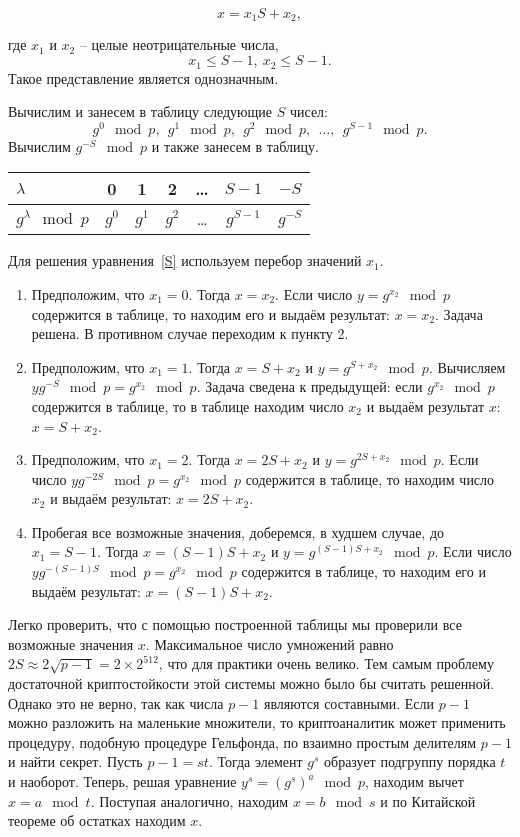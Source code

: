 \begin{equation}
    x=x_{1} S+x_{2},
    \label{S}
\end{equation}

где $x_{1}$ и $x_{2}$ -- целые неотрицательные числа,
    \[ x_{1} \le S-1, ~ x_{2} \le S-1. \]
Такое представление является однозначным.

Вычислим и занесем в таблицу следующие $S$  чисел:
    \[ g^{0} \mod p, ~~ g^{1} \mod p, ~~ g^{2} \mod p, ~~ \dots, ~~ g^{S-1} \mod p. \]
Вычислим $g^{-S} \mod p$ и также занесем в таблицу.

\begin{center} \begin{tabular}{|l|c|c|c|c|c|c|}
    \hline
    $\lambda $ & 0 & 1 & 2 & \dots & $S-1$ & $-S$ \\
    \hline
    $g^{\lambda} \mod p$ & $g^{0}$ & $g^{1}$ & $g^{2}$ & \dots & $g^{S-1}$ & $g^{-S}$ \\
    \hline
\end{tabular} \end{center}

Для решения уравнения~\ref{S} используем перебор значений $x_{1}$.
\begin{enumerate}
    \item Предположим, что $x_{1} = 0$. Тогда $x = x_{2}$. Если число $y = g^{x_{2}} \mod p$ содержится в таблице, то находим его и выдаём результат: $x=x_{2} $. Задача решена. В противном случае переходим к пункту 2.
    \item Предположим, что $x_{1} =1$. Тогда $x=S+x_{2} $ и $y=g^{S+x_{2}} \mod p$. Вычисляем $yg^{-S} \mod p=g^{x_{2}} \mod p$. Задача сведена к предыдущей: если $g^{x_{2} } \mod p$ содержится в таблице, то в таблице находим число $x_{2} $ и выдаём результат $x$: $x=S+x_{2} $.
    \item Предположим, что $x_{1} =2$. Тогда $x=2S+x_{2} $ и $y=g^{2S+x_{2} } \mod p$. Если число $yg^{-2S} \mod p=g^{x_{2} } \mod p$ содержится в таблице, то находим число $x_{2}$ и выдаём результат: $x = 2S + x_{2}$.
     \item Пробегая все возможные значения, доберемся, в худшем случае, до $x_{1} =S-1$. Тогда $x=(S-1)S+x_{2} $ и $y = g^{(S-1)S+x_{2} } \mod p$. Если число $yg^{-(S-1)S} \mod p=g^{x_{2}} \mod p$ содержится в таблице, то находим его и выдаём результат: $x=(S-1)S+x_{2}$.
\end{enumerate}

Легко проверить, что с помощью построенной таблицы мы проверили все возможные значения $x$. Максимальное число умножений равно $2S \approx 2\sqrt{p-1} =2\times 2^{512} $, что для практики очень велико. Тем самым проблему достаточной криптостойкости этой системы можно было бы считать решенной. Однако это не верно, так как числа $p-1$ являются составными. Если  $p-1$ можно разложить на маленькие множители, то криптоаналитик может применить процедуру, подобную процедуре Гельфонда, по взаимно простым делителям  $p-1$  и найти секрет. Пусть  $p-1=st$. Тогда элемент $g^s$ образует подгруппу порядка $t$ и наоборот. Теперь, решая уравнение $y^s=(g^s)^a\mod p$, находим вычет $x=a\mod t$. Поступая аналогично, находим $x=b\mod s$ и по Китайской теореме об остатках находим $x$.

